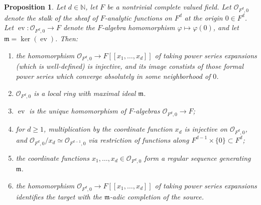 \documentclass[12pt]{article}
\newtheorem{proposition}[theorem]{Proposition}
\begin{document}
\begin{proposition}\label{localrings}
Let $d\in\mathbb{N}$, let $F$ be a nontrivial complete valued field.  Let $\mathcal{O}_{F^d,0}$ denote the stalk of the sheaf of $F$-analytic functions on $F^d$ at the origin $0\in F^d$.  Let $\operatorname{ev}:\mathcal{O}_{F^d,0}\rightarrow F$ denote the $F$-algebra homomorphism $\varphi\mapsto \varphi(0)$, and let $\mathfrak{m}=\operatorname{ker}(\operatorname{ev})$.  Then:
\begin{enumerate}
\item the homomorphism $\mathcal{O}_{F^d,0}\rightarrow F[[x_1,\ldots,x_d]]$ of taking power series expansions (which is well-defined) is injective, and its image constists of those formal power series which converge absolutely in some neighborhood of $0$.
\item $\mathcal{O}_{F^d,0}$ is a local ring with maximal ideal $\mathfrak{m}$.
\item $\operatorname{ev}$ is the unique homomorphism of $F$-algebras $\mathcal{O}_{F^d,0}\rightarrow F$;
\item for $d\geq 1$, multiplication by the coordinate function $x_d$ is injective on $\mathcal{O}_{F^d,0}$, and $\mathcal{O}_{F^d,0}/x_d \simeq \mathcal{O}_{F^{d-1},0}$ via restriction of functions along $F^{d-1}\times\{0\}\subset F^d$;
\item the coordinate functions $x_1,\ldots,x_d\in\mathcal{O}_{F^d,0}$ form a regular sequence generating $\mathfrak{m}$.
\item the homomorphism $\mathcal{O}_{F^d,0}\rightarrow F[[x_1,\ldots,x_d]]$ of taking power series expansions identifies the target with the $\mathfrak{m}$-adic completion of the source.
\end{enumerate}
\end{proposition}
\end{document}
